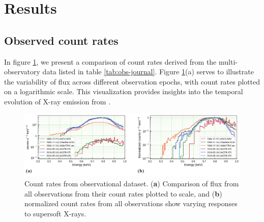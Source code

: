 \section{Results}

    \subsection{Observed count rates}
    In figure \ref{fig:all-counts}, we present a comparison of count rates derived from the multi-observatory data listed in table \ref{tab:obs-journal}. Figure \ref{fig:all-counts}(a) serves to illustrate the variability of flux across different observation epochs, with count rates plotted on a logarithmic scale. This visualization provides insights into the temporal evolution of X-ray emission from \source.
    
    \begin{figure}[!htb]
        \centering
        \includegraphics[width=\textwidth]{figures/ldata/mr-vel-rates_all-obs}
        \caption{Count rates from observational dataset. (\textbf{a}) Comparison of flux from all observations from their count rates plotted to scale, and (\textbf{b}) normalized count rates from all observations show varying responses to supersoft X-rays.}
        \label{fig:all-counts}
    \end{figure}

    
